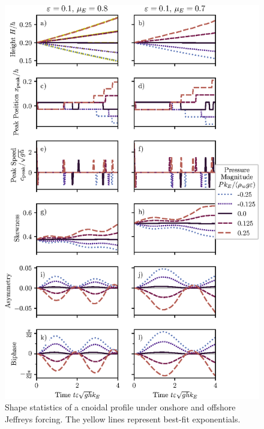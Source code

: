 \documentclass{jfm}
\begin{document}
\begin{figure}
  \centering
  \includegraphics{Skew-Asymm-Cnoidal.eps}
  \caption{
    Shape statistics of a cnoidal profile under onshore and offshore
    Jeffreys forcing. The yellow lines represent best-fit exponentials.
  }
\end{figure}
\end{document}
